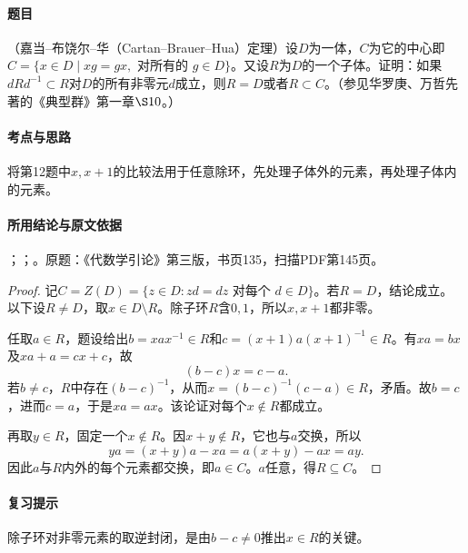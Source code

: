 \label{ex:3:56}

\paragraph{题目}

（嘉当--布饶尔--华（Cartan--Brauer--Hua）定理）设$D$为一体，$C$为它的中心即$C=\{x\in D\mid xg=gx,\text{ 对所有的 }g\in D\}$。又设$R$为$D$的一个子体。证明：如果$dRd^{-1}\subset R$对$D$的所有非零元$d$成立，则$R=D$或者$R\subset C$。（参见华罗庚、万哲先著的《典型群》第一章$\S10$。）

\paragraph{考点与思路}

将第12题中$x,x+1$的比较法用于任意除环，先处理子体外的元素，再处理子体内的元素。

\paragraph{所用结论与原文依据}

；；。原题：《代数学引论》第三版，书页135，扫描PDF第145页。


\begin{proof}

记$C=Z(D)=\{z\in D:zd=dz\text{ 对每个 }d\in D\}$。若$R=D$，结论成立。以下设$R\ne D$，取$x\in D\setminus R$。除子环$R$含$0,1$，所以$x,x+1$都非零。

任取$a\in R$，题设给出$b=xax^{-1}\in R$和$c=(x+1)a(x+1)^{-1}\in R$。有$xa=bx$及$xa+a=cx+c$，故
\[
(b-c)x=c-a.
\]
若$b\ne c$，$R$中存在$(b-c)^{-1}$，从而$x=(b-c)^{-1}(c-a)\in R$，矛盾。故$b=c$，进而$c=a$，于是$xa=ax$。该论证对每个$x\notin R$都成立。

再取$y\in R$，固定一个$x\notin R$。因$x+y\notin R$，它也与$a$交换，所以
\[
ya=(x+y)a-xa=a(x+y)-ax=ay.
\]
因此$a$与$R$内外的每个元素都交换，即$a\in C$。$a$任意，得$R\subseteq C$。

\end{proof}

\paragraph{复习提示}

除子环对非零元素的取逆封闭，是由$b-c\ne0$推出$x\in R$的关键。



